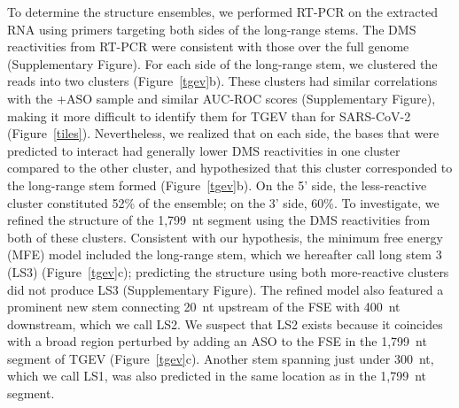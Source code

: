 \documentclass[main.tex]{subfiles}
\begin{document}
To determine the structure ensembles, we performed RT-PCR on the extracted RNA using primers targeting both sides of the long-range stems.
The DMS reactivities from RT-PCR were consistent with those over the full genome (Supplementary Figure).
For each side of the long-range stem, we clustered the reads into two clusters (Figure~\ref{tgev}b).
These clusters had similar correlations with the +ASO sample and similar AUC-ROC scores (Supplementary Figure), making it more difficult to identify them for TGEV than for SARS-CoV-2 (Figure~\ref{tiles}).
Nevertheless, we realized that on each side, the bases that were predicted to interact had generally lower DMS reactivities in one cluster compared to the other cluster, and hypothesized that this cluster corresponded to the long-range stem formed (Figure~\ref{tgev}b).
On the 5' side, the less-reactive cluster constituted 52\% of the ensemble; on the 3' side, 60\%.
To investigate, we refined the structure of the 1,799~nt segment using the DMS reactivities from both of these clusters.
Consistent with our hypothesis, the minimum free energy (MFE) model included the long-range stem, which we hereafter call long stem 3 (LS3) (Figure~\ref{tgev}c); predicting the structure using both more-reactive clusters did not produce LS3 (Supplementary Figure).
The refined model also featured a prominent new stem connecting 20~nt upstream of the FSE with 400~nt downstream, which we call LS2.
We suspect that LS2 exists because it coincides with a broad region perturbed by adding an ASO to the FSE in the 1,799~nt segment of TGEV (Figure~\ref{tgev}c).
Another stem spanning just under 300~nt, which we call LS1, was also predicted in the same location as in the 1,799~nt segment.
\end{document}
